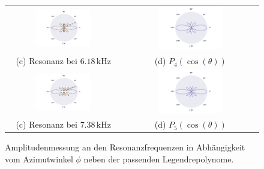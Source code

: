 \begin{figure}[H]
\begin{tabular}{cc}
  \includegraphics[width=0.5\textwidth]{Daten/Wasserstoff/peak2.pdf} &   \includegraphics[width=0.5\textwidth]{Daten/Wasserstoff/peakLeg2.pdf} \\
  (c) Resonanz bei $6.18 \,\si{\kilo\hertz}$ & (d) $P_4(\cos(\theta))$ \\[6pt]
  \includegraphics[width=0.5\textwidth]{Daten/Wasserstoff/peak3.pdf} &   \includegraphics[width=0.5\textwidth]{Daten/Wasserstoff/peakLeg3.pdf} \\
  (c) Resonanz bei $7.38 \,\si{\kilo\hertz}$ & (d) $P_5(\cos(\theta))$ \\[6pt]
  
  \end{tabular}
  \caption{Amplitudenmessung an den Resonanzfrequenzen in Abhängigkeit vom Azimutwinkel $\phi$ neben der passenden Legendrepolynome. } 
  \label{fig:hpeaks}
\end{figure}
